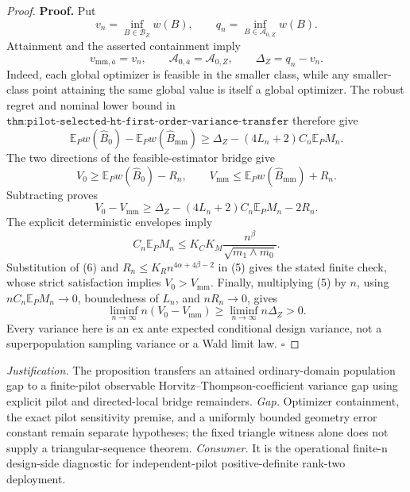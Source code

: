 \documentclass{article}
\begin{document}
\begin{proof}
\textbf{Proof.}
Put
\[
v_n=\inf_{B\in\mathcal B_Z}w(B),
\qquad q_n=\inf_{B\in\mathcal A_{0,Z}}w(B).
\tag{1}
\]
Attainment and the asserted containment imply
\[
v_{\mathrm{mm},\overline a}=v_n,
\qquad
\mathcal A_{0,\overline a}=\mathcal A_{0,Z},
\qquad
\Delta_Z=q_n-v_n.
\tag{2}
\]
Indeed, each global optimizer is feasible in the smaller class, while any smaller-class point attaining the same global value is itself a global optimizer.  The robust regret and nominal lower bound in \(\texttt{thm:pilot-selected-ht-first-order-variance-transfer}\) therefore give
\[
\mathbb E_Pw(\widehat B_0)-\mathbb E_Pw(\widehat B_{\mathrm{mm}})
\ge\Delta_Z-(4L_n+2)C_n\mathbb E_PM_n.
\tag{3}
\]
The two directions of the feasible-estimator bridge give
\[
V_0\ge\mathbb E_Pw(\widehat B_0)-R_n,
\qquad
V_{\mathrm{mm}}\le\mathbb E_Pw(\widehat B_{\mathrm{mm}})+R_n.
\tag{4}
\]
Subtracting proves
\[
V_0-V_{\mathrm{mm}}
\ge\Delta_Z-(4L_n+2)C_n\mathbb E_PM_n-2R_n.
\tag{5}
\]
The explicit deterministic envelopes imply
\[
C_n\mathbb E_PM_n\le K_CK_M\frac{n^\beta}{\sqrt{m_1\wedge m_0}}.
\tag{6}
\]
Substitution of (6) and \(R_n\le K_Rn^{4\alpha+4\beta-2}\) in (5) gives the stated finite check, whose strict satisfaction implies \(V_0>V_{\mathrm{mm}}\).  Finally, multiplying (5) by \(n\), using \(nC_n\mathbb E_PM_n\to0\), boundedness of \(L_n\), and \(nR_n\to0\), gives
\[
\liminf_{n\to\infty}n(V_0-V_{\mathrm{mm}})
\ge\liminf_{n\to\infty}n\Delta_Z>0.
\]
Every variance here is an ex ante expected conditional design variance, not a superpopulation sampling variance or a Wald limit law. \(\square\)
\end{proof}
\par\smallskip\noindent \textit{Justification.} The proposition transfers an attained ordinary-domain population gap to a finite-pilot observable Horvitz--Thompson-coefficient variance gap using explicit pilot and directed-local bridge remainders. \textit{Gap.} Optimizer containment, the exact pilot sensitivity premise, and a uniformly bounded geometry error constant remain separate hypotheses; the fixed triangle witness alone does not supply a triangular-sequence theorem. \textit{Consumer.} It is the operational finite-n design-side diagnostic for independent-pilot positive-definite rank-two deployment.
\end{document}
